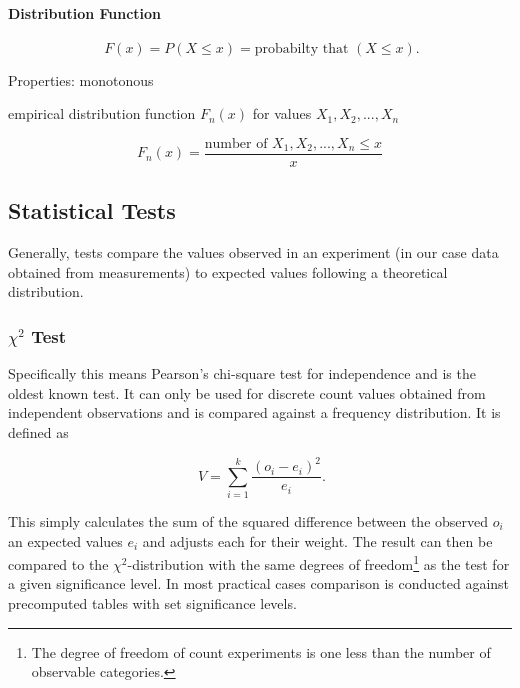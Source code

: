 \paragraph{Distribution Function}

\begin{equation}
\phantom{.} F(x) = P(X\leq x) = \text{probabilty that } (X \leq x).
\end{equation}

Properties: monotonous

empirical distribution function $F_n(x)$ for values $X_1, X_2, ... , X_n$

\begin{equation}
F_n(x) = \frac{\text{number of }X_1, X_2, ... , X_n \leq x}{x}
\end{equation}

\subsection{Statistical Tests}

Generally, tests compare the values observed in an experiment (in our case data obtained from measurements) to expected values following a theoretical distribution.




\subsubsection{$\chi^2$ Test}


Specifically this means Pearson's chi-square test for independence\cite{doi:10.1080/14786440009463897} and is the oldest known test. It can only be used for discrete count values obtained from independent observations and is compared against a frequency distribution. It is defined as

\begin{equation}
\phantom{.}V=\sum_{i=1}^{k} \frac{(o_i - e_i)^2}{e_i}\text{.}
\end{equation}

This simply calculates the sum of the squared difference between the observed $o_i$ an expected values $e_i$ and adjusts each for their weight. The result can then be compared to the $\chi^2$-distribution with the same degrees of freedom\footnote{The degree of freedom of count experiments is one less than the number of observable categories.} as the test for a given significance level. In most practical cases comparison is conducted against precomputed tables with set significance levels.


